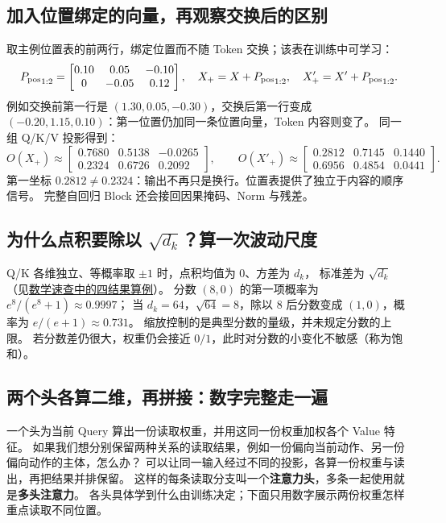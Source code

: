 \subsection{加入位置绑定的向量，再观察交换后的区别}
\label{sec:position-input}
取主例位置表的前两行，绑定位置而不随 Token 交换；该表在训练中可学习：
\[
{P_{\rm pos}}_{1:2}=\begin{bmatrix}
0.10&0.05&-0.10\\0&-0.05&0.12
\end{bmatrix},\quad
X_+=X+{P_{\rm pos}}_{1:2},\quad X'_+=X'+{P_{\rm pos}}_{1:2}.
\]
例如交换前第一行是 $(1.30,0.05,-0.30)$，交换后第一行变成
$(-0.20,1.15,0.10)$：第一位置仍加同一条位置向量，Token 内容则变了。
同一组 Q/K/V 投影得到：
\begin{equation}
O(X_+)\approx\begin{bmatrix}
0.7680&0.5138&-0.0265\\0.2324&0.6726&0.2092
\end{bmatrix},\qquad
O(X'_+)\approx\begin{bmatrix}
0.2812&0.7145&0.1440\\0.6956&0.4854&0.0441
\end{bmatrix}.
\label{eq:pos-swap-d3}
\end{equation}
第一坐标 $0.2812\ne0.2324$：输出不再只是换行。位置表提供了独立于内容的顺序信号。
完整自回归 Block 还会接回因果掩码、Norm 与残差。

\subsection{\texorpdfstring{为什么点积要除以 $\sqrt{d_k}$？算一次波动尺度}{为什么点积要除以 Key 维度平方根？}}
\label{concept:scaled-dot-product}

Q/K 各维独立、等概率取 $\pm1$ 时，点积均值为 $0$、方差为 $d_k$，
标准差为 $\sqrt{d_k}$（见\hyperref[app:variance-scaling]{数学速查中的四结果算例}）。
分数 $(8,0)$ 的第一项概率为 $e^8/(e^8+1)\approx0.9997$；
当 $d_k=64$，$\sqrt{64}=8$，除以 $8$ 后分数变成 $(1,0)$，概率为 $e/(e+1)\approx0.731$。
缩放控制的是典型分数的量级，并未规定分数的上限。
若分数差仍很大，权重仍会接近 $0/1$，此时对分数的小变化不敏感（称为饱和）。

\subsection{两个头各算二维，再拼接：数字完整走一遍}
\label{concept:multihead}

一个头为当前 Query 算出一份读取权重，并用这同一份权重加权各个 Value 特征。
如果我们想分别保留两种关系的读取结果，例如一份偏向当前动作、另一份偏向动作的主体，怎么办？
可以让同一输入经过不同的投影，各算一份权重与读出，再把结果并排保留。
这样的每条读取分支叫一个\textbf{注意力头}，多条一起使用就是\textbf{多头注意力}。
各头具体学到什么由训练决定；下面只用数字展示两份权重怎样重点读取不同位置。

